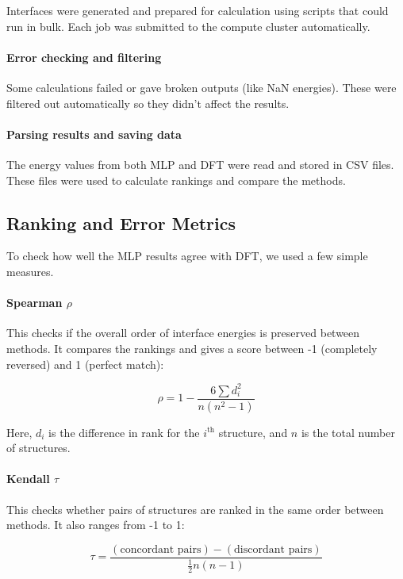 Interfaces were generated and prepared for calculation using scripts that could run in bulk. Each job was submitted to the compute cluster automatically.

\paragraph{Error checking and filtering}

Some calculations failed or gave broken outputs (like NaN energies). These were filtered out automatically so they didn’t affect the results.

\paragraph{Parsing results and saving data}

The energy values from both MLP and DFT were read and stored in CSV files. These files were used to calculate rankings and compare the methods.

\subsection{Ranking and Error Metrics}

To check how well the MLP results agree with DFT, we used a few simple measures.

\paragraph{Spearman \( \rho \)}

This checks if the overall order of interface energies is preserved between methods. It compares the rankings and gives a score between -1 (completely reversed) and 1 (perfect match):

\[
\rho = 1 - \frac{6 \sum d_i^2}{n(n^2 - 1)}
\]

Here, \( d_i \) is the difference in rank for the \( i^\text{th} \) structure, and \( n \) is the total number of structures.

\paragraph{Kendall \( \tau \)}

This checks whether pairs of structures are ranked in the same order between methods. It also ranges from -1 to 1:

\[
\tau = \frac{(\text{concordant pairs}) - (\text{discordant pairs})}{\frac{1}{2}n(n-1)}
\]


